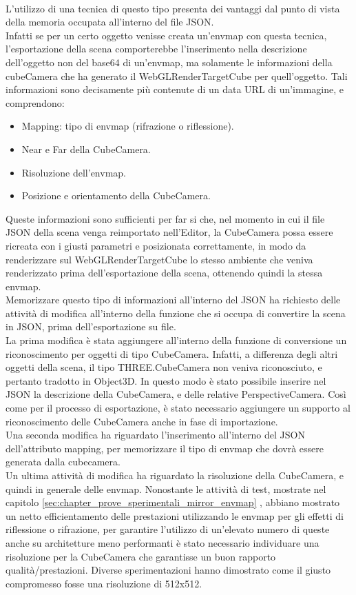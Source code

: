 \\ 
L’utilizzo di una tecnica di questo tipo presenta dei vantaggi dal punto di vista della memoria occupata all’interno del file JSON.
\\ 
Infatti se per un certo oggetto venisse creata un’envmap con questa tecnica, l’esportazione della scena comporterebbe l’inserimento nella descrizione dell’oggetto non del base64 di un’envmap, ma solamente le informazioni della cubeCamera che ha generato il WebGLRenderTargetCube per quell’oggetto. Tali informazioni sono decisamente più contenute di un data URL di un’immagine, e comprendono:
\begin{itemize}
\item Mapping: tipo di envmap (rifrazione o riflessione).
\item Near e Far della CubeCamera.
\item Risoluzione dell’envmap.
\item Posizione e orientamento della CubeCamera.
\end{itemize}
Queste informazioni sono sufficienti per far si che, nel momento in cui il file JSON della scena venga reimportato nell’Editor, la CubeCamera possa essere ricreata con i giusti parametri e posizionata correttamente, in modo da renderizzare sul WebGLRenderTargetCube lo stesso ambiente che veniva renderizzato prima dell’esportazione della scena, ottenendo quindi la stessa envmap.
\\
Memorizzare questo tipo di informazioni all’interno del JSON ha richiesto delle attività di modifica all’interno della funzione che si occupa di convertire la scena in JSON, prima dell’esportazione su file.
\\
La prima modifica è stata aggiungere all’interno della funzione di conversione un riconoscimento per oggetti di tipo CubeCamera. Infatti, a differenza degli altri oggetti della scena, il tipo THREE.CubeCamera non veniva riconosciuto, e pertanto tradotto in Object3D. In questo modo è stato possibile inserire nel JSON la descrizione della CubeCamera, e delle relative PerspectiveCamera. Così come per il processo di esportazione, è stato necessario aggiungere un supporto al riconoscimento delle CubeCamera anche in fase di importazione.
\\ 
Una seconda modifica ha riguardato l’inserimento all’interno del JSON dell’attributo mapping, per memorizzare il tipo di envmap che dovrà essere generata dalla cubecamera.
\\
Un ultima attività di modifica ha riguardato la risoluzione della CubeCamera, e quindi in generale delle envmap. Nonostante le attività di test, mostrate nel capitolo \ref{sec:chapter_prove_sperimentali_mirror_envmap} , abbiano mostrato un netto efficientamento delle prestazioni utilizzando le envmap per gli effetti di riflessione o rifrazione, per garantire l’utilizzo di un’elevato numero di queste anche su architetture meno performanti è stato necessario individuare una risoluzione per la CubeCamera che garantisse un buon rapporto qualità/prestazioni. Diverse sperimentazioni hanno dimostrato come il giusto compromesso fosse una risoluzione di 512x512.
